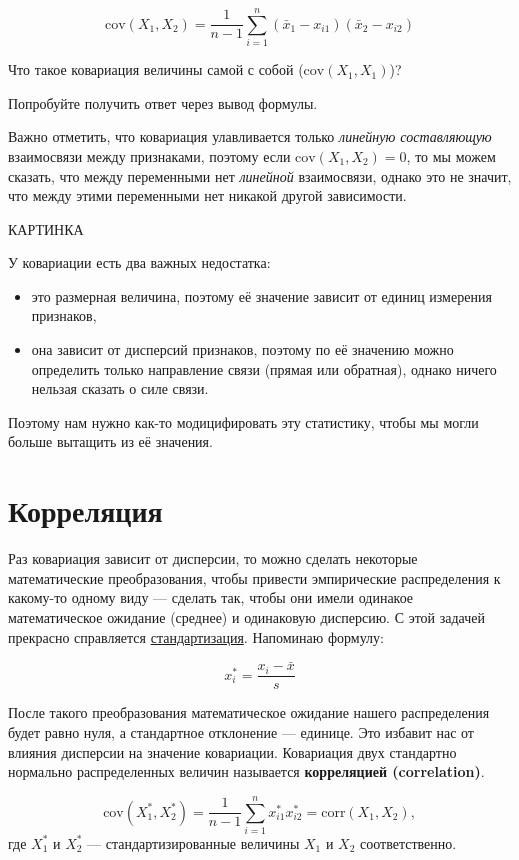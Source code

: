 \documentclass[
  letterpaper,
  DIV=11,
  numbers=noendperiod]{scrreprt}
\providecommand{\tightlist}{%
  \setlength{\itemsep}{0pt}\setlength{\parskip}{0pt}}\usepackage{longtable,booktabs,array}
\theoremstyle{definition}
\theoremstyle{remark}
\begin{document}
\[
\mathrm{cov}(X_1, X_2) = \frac{1}{n-1} \sum_{i=1}^n (\bar x_1 - x_{i1}) (\bar x_2 - x_{i2})
\]

Что такое ковариация величины самой с собой
(\(\mathrm{cov}(X_1, X_1)\))?

Попробуйте получить ответ через вывод формулы.

Важно отметить, что ковариация улавливается только \emph{линейную
составляющую} взаимосвязи между признаками, поэтому если
\(\mathrm{cov}(X_1,X_2) = 0\), то мы можем сказать, что между
переменными нет \emph{линейной} взаимосвязи, однако это не значит, что
между этими переменными нет никакой другой зависимости.

КАРТИНКА

У ковариации есть два важных недостатка:

\begin{itemize}
\tightlist
\item
  это размерная величина, поэтому её значение зависит от единиц
  измерения признаков,
\item
  она зависит от дисперсий признаков, поэтому по её значению можно
  определить только направление связи (прямая или обратная), однако
  ничего нельзая сказать о силе связи.
\end{itemize}

Поэтому нам нужно как-то модицифировать эту статистику, чтобы мы могли
больше вытащить из её значения.

\section{Корреляция}\label{andan-corr-cor}

Раз ковариация зависит от дисперсии, то можно сделать некоторые
математические преобразования, чтобы привести эмпирические распределения
к какому-то одному виду --- сделать так, чтобы они имели одинакое
математическое ожидание (среднее) и одинаковую дисперсию. С этой задачей
прекрасно справляется \hyperref[standartization]{стандартизация}.
Напоминаю формулу:

\[
x_i^* = \frac{x_i - \bar x}{s}
\]

После такого преобразования математическое ожидание нашего распределения
будет равно нуля, а стандартное отклонение --- единице. Это избавит нас
от влияния дисперсии на значение ковариации. Ковариация двух стандартно
нормально распределенных величин называется \textbf{корреляцией
(correlation)}.

\[
\mathrm{cov}(X_1^*, X_2^*) = \frac{1}{n-1} \sum_{i=1}^n x_{i1}^* x_{i2}^* = \mathrm{corr}(X_1, X_2),
\] где \(X_1^*\) и \(X_2^*\) --- стандартизированные величины \(X_1\) и
\(X_2\) соответственно.
\end{document}
